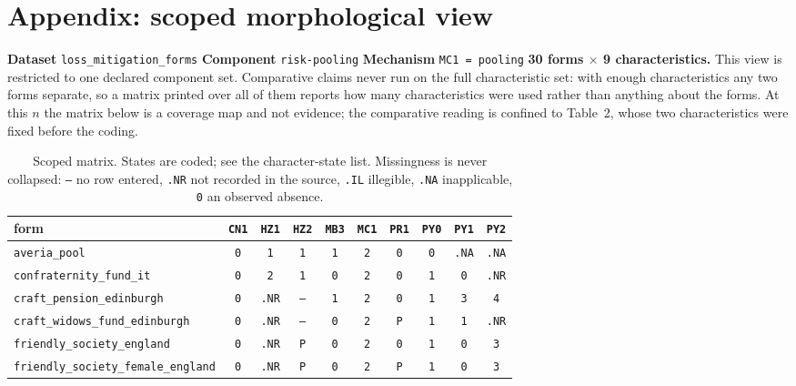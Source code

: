 \documentclass[11pt,a4paper]{article}
\begin{document}
\section*{Appendix: scoped morphological view}
\textbf{Dataset} \texttt{loss\_mitigation\_forms} \quad \textbf{Component} \texttt{risk-pooling} \quad \textbf{Mechanism} \texttt{MC1 = pooling}
\textbf{30 forms $\times$ 9 characteristics.} This view is restricted to one declared component set. Comparative claims never run on the full characteristic set: with enough characteristics any two forms separate, so a matrix printed over all of them reports how many characteristics were used rather than anything about the forms. At this $n$ the matrix below is a coverage map and not evidence; the comparative reading is confined to Table~2, whose two characteristics were fixed before the coding.
\begin{table}[htbp]\centering\small
\caption{Scoped matrix. States are coded; see the character-state list. Missingness is never collapsed: \texttt{--} no row entered, \texttt{.NR} not recorded in the source, \texttt{.IL} illegible, \texttt{.NA} inapplicable, \texttt{0} an observed absence.}
\begin{tabular}{lccccccccc}
\toprule
form & \texttt{CN1} & \texttt{HZ1} & \texttt{HZ2} & \texttt{MB3} & \texttt{MC1} & \texttt{PR1} & \texttt{PY0} & \texttt{PY1} & \texttt{PY2} \\
\midrule
\texttt{averia\_pool} & \texttt{0} & \texttt{1} & \texttt{1} & \texttt{1} & \texttt{2} & \texttt{0} & \texttt{0} & \texttt{.NA} & \texttt{.NA} \\
\texttt{confraternity\_fund\_it} & \texttt{0} & \texttt{2} & \texttt{1} & \texttt{0} & \texttt{2} & \texttt{0} & \texttt{1} & \texttt{0} & \texttt{.NR} \\
\texttt{craft\_pension\_edinburgh} & \texttt{0} & \texttt{.NR} & \texttt{--} & \texttt{1} & \texttt{2} & \texttt{0} & \texttt{1} & \texttt{3} & \texttt{4} \\
\texttt{craft\_widows\_fund\_edinburgh} & \texttt{0} & \texttt{.NR} & \texttt{--} & \texttt{0} & \texttt{2} & \texttt{P} & \texttt{1} & \texttt{1} & \texttt{.NR} \\
\texttt{friendly\_society\_england} & \texttt{0} & \texttt{.NR} & \texttt{P} & \texttt{0} & \texttt{2} & \texttt{0} & \texttt{1} & \texttt{0} & \texttt{3} \\
\texttt{friendly\_society\_female\_england} & \texttt{0} & \texttt{.NR} & \texttt{P} & \texttt{0} & \texttt{2} & \texttt{P} & \texttt{1} & \texttt{0} & \texttt{3} \\

\end{tabular}
\end{table}
\end{document}
